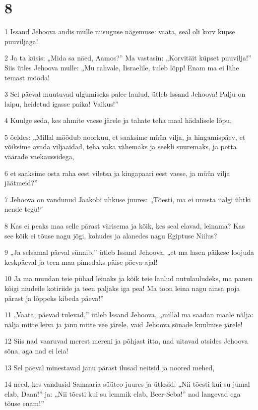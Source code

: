 \chapter{8}

\par 1 Issand Jehoova andis mulle niisuguse nägemuse: vaata, seal oli korv küpse puuviljaga!
\par 2 Ja ta küsis: „Mida sa näed, Aamos?” Ma vastasin: „Korvitäit küpset puuvilja!” Siis ütles Jehoova mulle: „Mu rahvale, Iisraelile, tuleb lõpp! Enam ma ei lähe temast mööda!
\par 3 Sel päeval muutuvad ulgumiseks palee laulud, ütleb Issand Jehoova! Palju on laipu, heidetud igasse paika! Vaikus!”
\par 4 Kuulge seda, kes ahmite vaese järele ja tahate teha maal hädalisele lõpu,
\par 5 öeldes: „Millal möödub noorkuu, et saaksime müüa vilja, ja hingamispäev, et võiksime avada viljaaidad, teha vaka vähemaks ja seekli suuremaks, ja petta väärade vaekaussidega,
\par 6 et saaksime osta raha eest viletsa ja kingapaari eest vaese, ja müüa vilja jäätmeid?”
\par 7 Jehoova on vandunud Jaakobi uhkuse juures: „Tõesti, ma ei unusta iialgi ühtki nende tegu!”
\par 8 Kas ei peaks maa selle pärast värisema ja kõik, kes seal elavad, leinama? Kas see kõik ei tõuse nagu jõgi, kohudes ja alanedes nagu Egiptuse Niilus?
\par 9 „Ja selsamal päeval sünnib,” ütleb Issand Jehoova, „et ma lasen päikese loojuda keskpäeval ja teen maa pimedaks päise päeva ajal!
\par 10 Ja ma muudan teie pühad leinaks ja kõik teie laulud nutulauludeks, ma panen kõigi niudeile kotiriide ja teen paljaks iga pea! Ma toon leina nagu ainsa poja pärast ja lõppeks kibeda päeva!”
\par 11 „Vaata, päevad tulevad,” ütleb Issand Jehoova, „millal ma saadan maale nälja: nälja mitte leiva ja janu mitte vee järele, vaid Jehoova sõnade kuulmise järele!
\par 12 Siis nad vaaruvad merest mereni ja põhjast itta, nad uitavad otsides Jehoova sõna, aga nad ei leia!
\par 13 Sel päeval minestavad janu pärast ilusad neitsid ja noored mehed,
\par 14 need, kes vandusid Samaaria süüteo juures ja ütlesid: „Nii tõesti kui su jumal elab, Daan!” ja: „Nii tõesti kui su lemmik elab, Beer-Seba!” nad langevad ega tõuse enam!”

